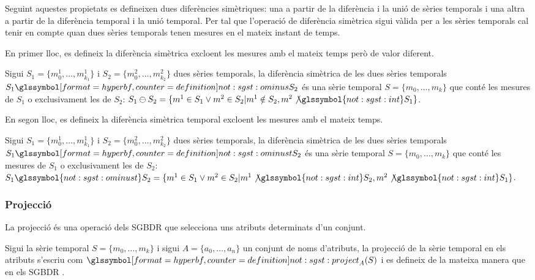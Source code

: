 Seguint aquestes propietats es defineixen dues diferències
simètriques: una a partir de la diferència i la unió de sèries
temporals i una altra a partir de la diferència temporal i la unió
temporal.  Per tal que l'operació de diferència simètrica sigui vàlida
per a les sèries temporals cal tenir en compte quan dues sèries
temporals tenen mesures en el mateix instant de temps.

En primer lloc, es defineix la diferència simètrica excloent les
mesures amb el mateix temps però de valor diferent.
\begin{definition}
  Sigui $S_1=\{m_0^1, \dotsc, m_{k_1}^1\}$ i $S_2=\{m_0^2, \dotsc,
  m_{k_2}^2\}$ dues sèries temporals, la diferència simètrica de les
  dues sèries temporals $S_1 \glssymboldef{not:sgst:ominus} S_2$ és
  una sèrie temporal $S=\{m_0, \dotsc, m_k\}$ que conté les mesures de
  $S_1$ o exclusivament les de $S_2$: $S_1 \ominus S_2 = \{ m^1 \in
  S_1 \vee m^2 \in S_2 | m^1 \notin S_2, m^2
  \not\glssymbol{not:sgst:int} S_1 \}$.
\end{definition}

En segon lloc, es defineix la diferència simètrica temporal excloent les
mesures amb el mateix temps.
\begin{definition}
  Sigui $S_1=\{m_0^1, \dotsc, m_{k_1}^1\}$ i $S_2=\{m_0^2, \dotsc,
  m_{k_2}^2\}$ dues sèries temporals, la diferència simètrica de les
  dues sèries temporals $S_1 \glssymboldef{not:sgst:ominust} S_2$ és
  una sèrie temporal $S=\{m_0, \dotsc, m_k\}$ que conté les mesures de
  $S_1$ o exclusivament les de $S_2$: $S_1
  \glssymbol{not:sgst:ominust} S_2 = \{ m^1 \in S_1 \vee m^2 \in S_2 |
  m^1 \not\glssymbol{not:sgst:int} S_2, m^2
  \not\glssymbol{not:sgst:int} S_1 \}$.
\end{definition}



\subsubsection{Projecció}

La projecció és una operació dels \gls{SGBDR} que selecciona uns
atributs determinats d'un conjunt. 

\begin{definition}[projecció]
  Sigui la sèrie temporal $S=\{ m_0,\dotsc,m_k\}$ i sigui $A=\{a_0,
  \dotsc, a_n\}$ un conjunt de noms d'atributs, la projecció de la
  sèrie temporal en els atributs s'escriu com
  $\glssymboldef{not:sgst:project}_A(S)$ i es defineix de la mateixa
  manera que en els
  \gls{SGBDR} \parencite[cap.~7]{date04:introduction8}.
\end{definition}

